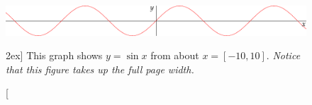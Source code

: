 \begin{figure}[t!]
  \includegraphics[width=\linewidth]{fg-tufte-wide-sine}%
  \caption[Example file fg-tufte-wide-sine.tex][2ex]
  {This graph shows $y = \sin x$ from about $x = [-10, 10]$.
  \emph{Notice that this figure takes up the full page width.}}%
  \label{fg-tufte-wide-sine}%
\end{figure}